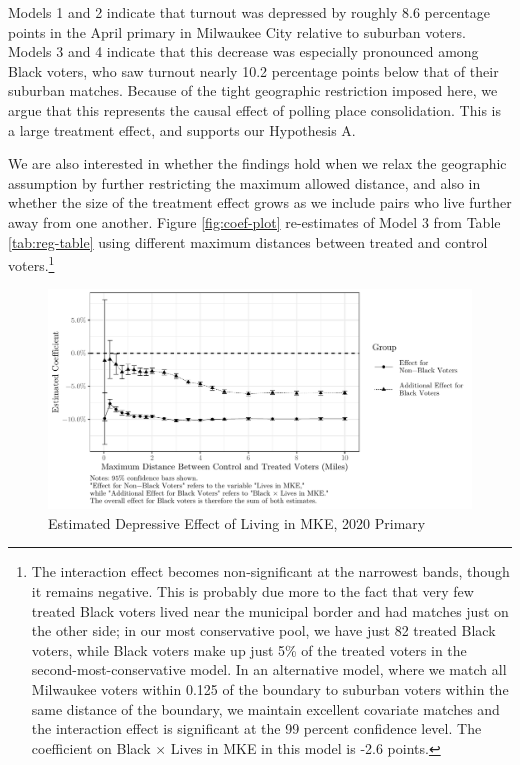 \documentclass[
  12pt,
]{article}
\begin{document}
\begin{singlespace}


\end{singlespace}

Models 1 and 2 indicate that turnout was depressed by roughly 8.6 percentage points in the April primary in Milwaukee City relative to suburban voters. Models 3 and 4 indicate that this decrease was especially pronounced among Black voters, who saw turnout nearly 10.2 percentage points below that of their suburban matches. Because of the tight geographic restriction imposed here, we argue that this represents the causal effect of polling place consolidation. This is a large treatment effect, and supports our Hypothesis A.

We are also interested in whether the findings hold when we relax the geographic assumption by further restricting the maximum allowed distance, and also in whether the size of the treatment effect grows as we include pairs who live further away from one another. Figure \ref{fig:coef-plot} re-estimates of Model 3 from Table \ref{tab:reg-table} using different maximum distances between treated and control voters.\footnote{The interaction effect becomes non-significant at the narrowest bands, though it remains negative. This is probably due more to the fact that very few treated Black voters lived near the municipal border and had matches just on the other side; in our most conservative pool, we have just 82 treated Black voters, while Black voters make up just 5\% of the treated voters in the second-most-conservative model. In an alternative model, where we match all Milwaukee voters within 0.125 of the boundary to suburban voters within the same distance of the boundary, we maintain excellent covariate matches and the interaction effect is significant at the 99 percent confidence level. The coefficient on Black × Lives in MKE in this model is -2.6 points.}

\begin{figure}[H]

{\centering \includegraphics{markdown_files/figure-latex/plot-1} 

}

\caption{\label{fig:coef-plot}Estimated Depressive Effect of Living in MKE, 2020 Primary}\label{fig:plot}
\end{figure}
\end{document}

